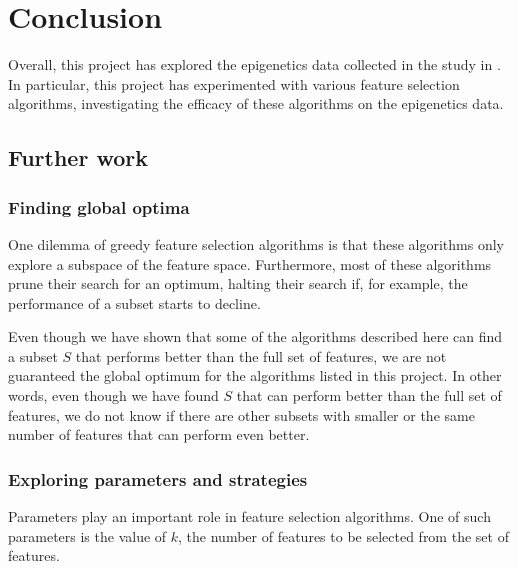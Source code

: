 \documentclass[12pt, twoside, a4paper]{report}
\begin{document}
\chapter{Conclusion}

Overall, this project has explored the epigenetics data collected in the study in \cite{RefWorks:78}. In particular, this project has experimented with various feature selection algorithms, investigating the efficacy of these algorithms on the epigenetics data.

\section{Further work} \label{further_work}

\subsection{Finding global optima}

One dilemma of greedy feature selection algorithms is that these algorithms only explore a subspace of the feature space. Furthermore, most of these algorithms prune their search for an optimum, halting their search if, for example, the performance of a subset starts to decline.

Even though we have shown that some of the algorithms described here can find a subset $S$ that performs better than the full set of features, we are not guaranteed the global optimum for the algorithms listed in this project. In other words, even though we have found $S$ that can perform better than the full set of features, we do not know if there are other subsets with smaller or the same number of features that can perform even better.

 

\subsection{Exploring parameters and strategies}

Parameters play an important role in feature selection algorithms. One of such parameters is the value of $k$, the number of features to be selected from the set of features.
\end{document}
